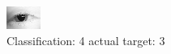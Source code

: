 \begin{figure}[h!]
\begin{center}
\includegraphics[width=0.60\columnwidth]{figures/ID82_class_4_target_3.png}
\end{center}
\caption{ Classification: 4 actual target: 3}
\label{fig:ID82_class_4_target_3}
\end{figure}
